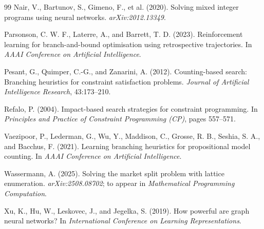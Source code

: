 \documentclass[preprint,12pt]{elsarticle}
\begin{document}
\begin{thebibliography}{99}
Nair, V., Bartunov, S., Gimeno, F., et al. (2020).
Solving mixed integer programs using neural networks.
\emph{arXiv:2012.13349}.

Parsonson, C. W. F., Laterre, A., and Barrett, T. D. (2023).
Reinforcement learning for branch-and-bound optimisation using retrospective trajectories.
In \emph{AAAI Conference on Artificial Intelligence}.

Pesant, G., Quimper, C.-G., and Zanarini, A. (2012).
Counting-based search: Branching heuristics for constraint satisfaction problems.
\emph{Journal of Artificial Intelligence Research}, 43:173--210.

Refalo, P. (2004).
Impact-based search strategies for constraint programming.
In \emph{Principles and Practice of Constraint Programming (CP)}, pages 557--571.

Vaezipoor, P., Lederman, G., Wu, Y., Maddison, C., Grosse, R. B., Seshia, S. A., and Bacchus, F. (2021).
Learning branching heuristics for propositional model counting.
In \emph{AAAI Conference on Artificial Intelligence}.

Wassermann, A. (2025).
Solving the market split problem with lattice enumeration.
\emph{arXiv:2508.08702}; to appear in \emph{Mathematical Programming Computation}.

Xu, K., Hu, W., Leskovec, J., and Jegelka, S. (2019).
How powerful are graph neural networks?
In \emph{International Conference on Learning Representations}.

\end{thebibliography}
\end{document}
